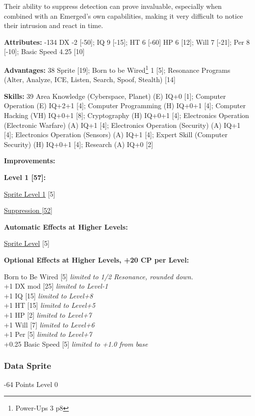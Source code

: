 \begin{multicols*}{3}
Their ability to suppress detection can prove invaluable, especially when combined with an Emerged's own capabilities, making it very difficult to notice their intrusion and react in time.

\textbf{Attributes:} -134
DX -2 [-50]; IQ 9 [-15]; HT 6 [-60]
HP 6 [12]; Will 7 [-21]; Per 8 [-10]; Basic Speed 4.25 [10]

\textbf{Advantages:} 38
Sprite [19]; Born to be Wired\footnote{Power-Ups 3 p8} 1 [5]; Resonance Programs (Alter, Analyze, ICE, Listen, Search, Spoof, Stealth) [14]

\textbf{Skills:} 39
Area Knowledge (Cyberspace, Planet) (E) IQ+0 [1]; Computer Operation (E) IQ+2+1 [4]; Computer Programming (H) IQ+0+1 [4]; Computer Hacking (VH) IQ+0+1 [8]; Cryptography (H) IQ+0+1 [4]; Electronics Operation (Electronic Warfare) (A) IQ+1 [4]; Electronics Operation (Security) (A) IQ+1 [4]; Electronics Operation (Sensors) (A) IQ+1 [4]; Expert Skill (Computer Security) (H) IQ+0+1 [4]; Research (A) IQ+0 [2]

\textbf{ Improvements:}

\textbf{Level 1 [57]:}

\hyperref[sprite_level]{Sprite Level 1} [5]

\hyperref[suppression]{Suppression [52]}

\textbf{Automatic Effects at Higher Levels:}

\hyperref[sprite_level]{Sprite Level} [5]

\textbf{Optional Effects at Higher Levels, +20 CP per Level:}

Born to Be Wired [5] \textit{limited to 1/2 Resonance, rounded down.}\\
+1 DX mod [25] \textit{limited to Level-1}\\
+1 IQ [15] \textit{limited to Level+8}\\
+1 HT [15] \textit{limited to Level+5}\\
+1 HP [2] \textit{limited to Level+7}\\
+1 Will [7] \textit{limited to Level+6}\\
+1 Per [5] \textit{limited to Level+7}\\
+0.25 Basic Speed [5] \textit{limited to +1.0 from base}\\

\subsubsection{Data Sprite}
\begin{flushright}
	-64 Points Level 0
\end{flushright}


\end{multicols*}

